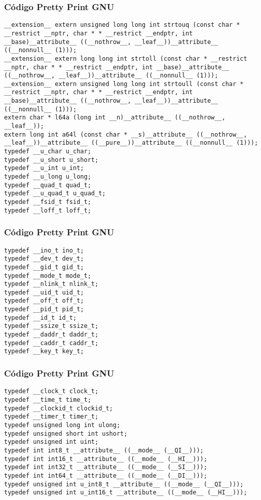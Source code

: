 \documentclass{beamer}
\begin{document}
\begin{frame}[fragile]
\frametitle{C\'odigo Pretty Print GNU}
\begin{verbatim}
__extension__ extern unsigned long long int strtouq (const char * __restrict __nptr, char * * __restrict __endptr, int __base)__attribute__ ((__nothrow__, __leaf__))__attribute__ ((__nonnull__ (1)));
__extension__ extern long long int strtoll (const char * __restrict __nptr, char * * __restrict __endptr, int __base)__attribute__ ((__nothrow__, __leaf__))__attribute__ ((__nonnull__ (1)));
__extension__ extern unsigned long long int strtoull (const char * __restrict __nptr, char * * __restrict __endptr, int __base)__attribute__ ((__nothrow__, __leaf__))__attribute__ ((__nonnull__ (1)));
extern char * l64a (long int __n)__attribute__ ((__nothrow__, __leaf__));
extern long int a64l (const char * __s)__attribute__ ((__nothrow__, __leaf__))__attribute__ ((__pure__))__attribute__ ((__nonnull__ (1)));
typedef __u_char u_char;
typedef __u_short u_short;
typedef __u_int u_int;
typedef __u_long u_long;
typedef __quad_t quad_t;
typedef __u_quad_t u_quad_t;
typedef __fsid_t fsid_t;
typedef __loff_t loff_t;
\end{verbatim}
\end{frame}
\begin{frame}[fragile]
\frametitle{C\'odigo Pretty Print GNU}
\begin{verbatim}
typedef __ino_t ino_t;
typedef __dev_t dev_t;
typedef __gid_t gid_t;
typedef __mode_t mode_t;
typedef __nlink_t nlink_t;
typedef __uid_t uid_t;
typedef __off_t off_t;
typedef __pid_t pid_t;
typedef __id_t id_t;
typedef __ssize_t ssize_t;
typedef __daddr_t daddr_t;
typedef __caddr_t caddr_t;
typedef __key_t key_t;
\end{verbatim}
\end{frame}
\begin{frame}[fragile]
\frametitle{C\'odigo Pretty Print GNU}
\begin{verbatim}
typedef __clock_t clock_t;
typedef __time_t time_t;
typedef __clockid_t clockid_t;
typedef __timer_t timer_t;
typedef unsigned long int ulong;
typedef unsigned short int ushort;
typedef unsigned int uint;
typedef int int8_t __attribute__ ((__mode__ (__QI__)));
typedef int int16_t __attribute__ ((__mode__ (__HI__)));
typedef int int32_t __attribute__ ((__mode__ (__SI__)));
typedef int int64_t __attribute__ ((__mode__ (__DI__)));
typedef unsigned int u_int8_t __attribute__ ((__mode__ (__QI__)));
typedef unsigned int u_int16_t __attribute__ ((__mode__ (__HI__)));
\end{verbatim}
\end{frame}
\end{document}
